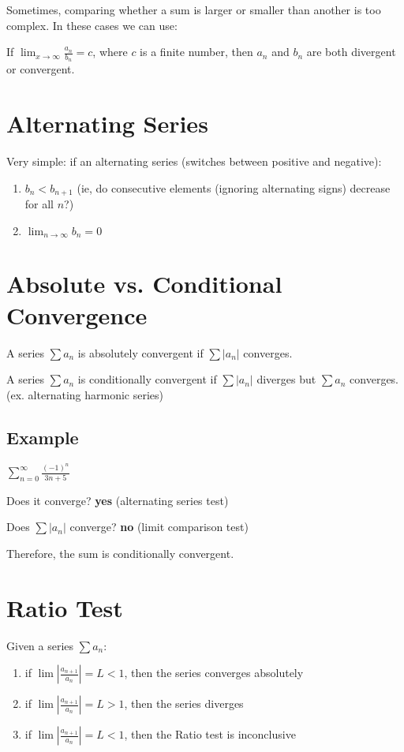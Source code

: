 \documentclass{article}
\begin{document}
Sometimes, comparing whether a sum is larger or smaller than another is too complex. In these cases we can use: 

If $\lim_{x\to\infty} \frac{a_n}{b_n} = c$, where $c$ is a finite number, then $a_n$ and $b_n$ are both divergent or convergent. 

\section{Alternating Series}

Very simple: if an alternating series (switches between positive and negative): 

\begin{enumerate}
    \item $b_n < b_{n+1}$ (ie, do consecutive elements (ignoring alternating signs) decrease for all $n$?)
    \item $\lim_{n\to\infty} b_n = 0$
\end{enumerate}

\section{Absolute vs. Conditional Convergence}

A series $\sum a_n$ is absolutely convergent if $\sum |a_n|$ converges.

A series $\sum a_n$ is conditionally convergent if $\sum |a_n|$ diverges but $\sum a_n$ converges. (ex. alternating harmonic series)

\subsection{Example}
$\sum_{n=0}^{\infty} \frac{(-1)^n}{3n+5}$

Does it converge? \textbf{yes} (alternating series test)

Does $\sum |a_n|$ converge? \textbf{no} (limit comparison test)

Therefore, the sum is conditionally convergent.

\section{Ratio Test}

Given a series $\sum a_n$: 

\begin{enumerate}
    \item if $\lim |\frac{a_{n+1}}{a_n}| = L < 1$, then the series converges absolutely 
    \item if $\lim |\frac{a_{n+1}}{a_n}| = L > 1$, then the series diverges
    \item if $\lim |\frac{a_{n+1}}{a_n}| = L < 1$, then the Ratio test is inconclusive
\end{enumerate}
\end{document}
